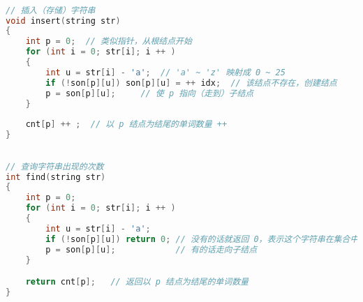 \begin{lstlisting}[language=cpp]

// 插入（存储）字符串
void insert(string str)
{
    int p = 0;  // 类似指针，从根结点开始
    for (int i = 0; str[i]; i ++ )
    {
        int u = str[i] - 'a';  // 'a' ~ 'z' 映射成 0 ~ 25
        if (!son[p][u]) son[p][u] = ++ idx;  // 该结点不存在，创建结点
        p = son[p][u];     // 使 p 指向（走到）子结点
    }
    
    cnt[p] ++ ;  // 以 p 结点为结尾的单词数量 ++ 
}
\end{lstlisting}

\begin{lstlisting}[language=cpp]

// 查询字符串出现的次数
int find(string str)
{
    int p = 0;
    for (int i = 0; str[i]; i ++ )
    {
        int u = str[i] - 'a';
        if (!son[p][u]) return 0; // 没有的话就返回 0，表示这个字符串在集合中没有出现过
        p = son[p][u];            // 有的话走向子结点
    }

    return cnt[p];   // 返回以 p 结点为结尾的单词数量
}
\end{lstlisting}